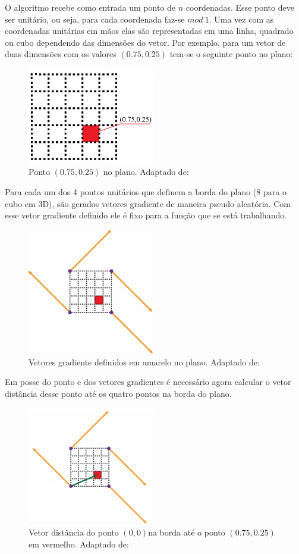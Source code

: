 \documentclass[12pt, 
openright, 
oneside, 
a4paper,    
brazil]{facom-ufu-abntex2}
\begin{document}
O algoritmo recebe como entrada um ponto de $n$ coordenadas. Esse ponto deve ser unitário, ou seja, para cada coordenada faz-se $ mod~1$. Uma vez com as coordenadas unitárias em mãos elas são representadas em uma linha, quadrado ou cubo dependendo das dimensões do vetor. Por exemplo, para um vetor de duas dimensões com os valores $(0.75, 0.25)$ tem-se o seguinte ponto no plano:

\begin{figure}[H]
	\centering
	\includegraphics[width=15em]{imagens/perlinPoint.png}
	\caption{Ponto $(0.75, 0.25)$ no plano. Adaptado de: \cite{Fataho}}
\end{figure}

Para cada um dos 4 pontos unitários que definem a borda do plano (8 para o cubo em 3D), são gerados vetores gradiente de maneira pseudo aleatória. Com esse vetor gradiente definido ele é fixo para a função que se está trabalhando.

\begin{figure}[H]
	\centering
	\includegraphics[width=15em]{imagens/perlinGradients.png}
	\caption{Vetores gradiente definidos em amarelo no plano. Adaptado de: \cite{Fataho}}
\end{figure}

Em posse do ponto e dos vetores gradientes é necessário agora calcular o vetor distância desse ponto até os quatro pontos na borda do plano.

\begin{figure}[H]
	\centering
	\includegraphics[width=15em]{imagens/perlinGradientsAndOneDistance.png}
	\caption{Vetor distância do ponto $(0,0)$na borda até o ponto $(0.75,0.25)$ em vermelho. Adaptado de: \cite{Fataho}}
\end{figure}
\end{document}
